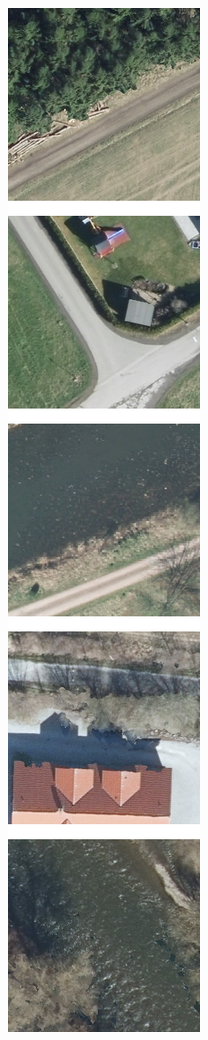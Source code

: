 \begin{figure}[h]
    \begin{subfigure}{0.0866\textwidth}
        \includegraphics[width=\textwidth]{images/wnet/original}

\end{subfigure}
\end{figure}
